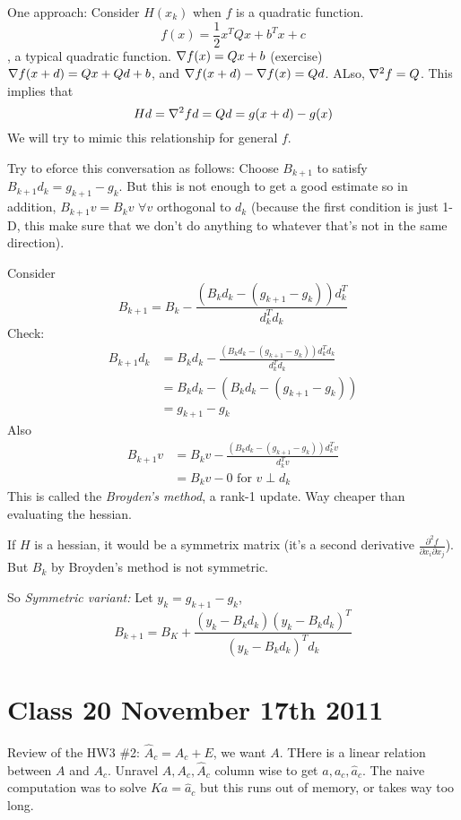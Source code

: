 One approach: Consider $H(x_k)$ when $f$ is a quadratic
function. $$f(x) = \frac{1}{2}x^TQx + b^Tx + c$$, a typical quadratic
function.
$\nabla f(x) = Qx+b$ (exercise)
$\nabla f(x+d) = Qx + Qd + b$, and $\nabla f(x+d) - \nabla f(x) = Qd$.
ALso, $\nabla^2 f = Q$. This implies that $$Hd = \nabla^2f d = Qd = g(x+d) - g(x)$$ We
will try to mimic this relationship for general $f$. 

Try to eforce this conversation as follows:
Choose $B_{k+1}$ to satisfy $B_{k+1}d_k = g_{k+1} - g_k$. But this is
not enough to get a good estimate so in addition,
$B_{k+1}v = B_kv$ $\forall v$ orthogonal to $d_k$ (because the first
condition is just 1-D, this make sure that we don't do anything to
whatever that's not in the same direction).

Consider
$$B_{k+1} = B_k - \frac{(B_kd_k - (g_{k+1} - g_k))d_k^T}{d_k^Td_k}$$
Check: 
\begin{align*}
B_{k+1}d_k &= B_kd_k - \frac{(B_kd_k - (g_{k+1} -
  g_k))d_k^Td_k}{d_k^Td_k}\\  
&= B_kd_k - (B_kd_k - (g_{k+1} - g_k))\\  
&= g_{k+1} - g_k
\end{align*}
Also 
\begin{align*}
  B_{k+1}v &= B_kv - \frac{(B_kd_k - (g_{k+1} -
    g_k))d_k^Tv}{d_k^Tv}\\  
&= B_kv - 0 \text{ for $v \perp d_k$}
\end{align*}
This is called the \emph{Broyden's method}, a rank-1 update. Way
cheaper than evaluating the hessian.

If $H$ is a hessian, it would be a symmetrix matrix (it's a second
derivative $\frac{\partial^2 f}{\partial x_i\partial x_j}$). But $B_k$
by Broyden's method is not symmetric.

So \emph{Symmetric variant:}
Let $y_k = g_{k+1} - g_k$, $$B_{k+1} = B_K +
\frac{(y_k-B_kd_k)(y_k-B_kd_k)^T}{(y_k-B_kd_k)^Td_k}$$

\pagebreak

\section{Class 20 November 17th 2011}
\label{sec:class20}
Review of the HW3 \#2:
$\hat A_c = A_c + E$, we want $A$. THere is a linear relation between
$A$ and $A_c$. Unravel $A,A_c,\hat A_c$ column wise to get $a,a_c,\hat
a_c$.
The naive computation was to solve $Ka = \hat a_c$ but this runs out
of memory, or takes way too long.

